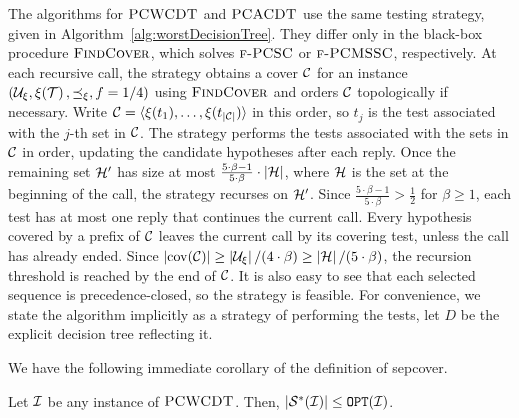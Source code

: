 
The algorithms for $\textup{\textsc{PCWCDT}}$ and $\textup{\textsc{PCACDT}}$ use the same testing strategy, given in Algorithm~\ref{alg:worstDecisionTree}. They differ only in the black-box procedure $\textup{\textsc{FindCover}}{}$, which solves $\textup{\textsc{f-PCSC}}$ or $\textup{\textsc{f-PCMSSC}}$, respectively.
At each recursive call, the strategy obtains a cover $\mathcal{C}$ for an instance $\mathopen{}\left( \mathcal{U}_{\xi},\xi\mathopen{}\left( \mathcal{T} \right),\preceq_{\xi},f=1/4 \right)$ using $\textup{\textsc{FindCover}}{}$ and orders $\mathcal{C}$ topologically if necessary. Write $\mathcal{C}=\mathopen{}\langle \xi(t_1),\ldots,\xi(t_{\mathopen{}\left| \mathcal{C} \right|}) \rangle$ in this order, so $t_j$ is the test associated with the $j$-th set in $\mathcal{C}$.
The strategy performs the tests associated with the sets in $\mathcal{C}$ in order, updating the candidate hypotheses after each reply. Once the remaining set $\mathcal{H}'$ has size at most $\frac{5\cdot\beta-1}{5\cdot\beta}\cdot\mathopen{}\left| \mathcal{H} \right|$, where $\mathcal{H}$ is the set at the beginning of the call, the strategy recurses on $\mathcal{H}'$. Since $\frac{5\cdot\beta-1}{5\cdot\beta}>\frac12$ for $\beta\geq1$, each test has at most one reply that continues the current call.
Every hypothesis covered by a prefix of $\mathcal{C}$ leaves the current call by its covering test, unless the call has already ended. Since $\mathopen{}\left| \operatorname{cov}\mathopen{}\left( \mathcal{C} \right) \right|\geq\mathopen{}\left| \mathcal{U}_{\xi} \right|/(4\cdot\beta)\geq\mathopen{}\left| \mathcal{H} \right|/(5\cdot\beta)$, the recursion threshold is reached by the end of $\mathcal{C}$. It is also easy to see that each selected sequence is precedence-closed, so the strategy is feasible.
For convenience, we state the algorithm implicitly as a strategy of performing the tests, let $D$ be the explicit decision tree reflecting it. 




We have the following immediate corollary of the definition of sepcover.
\begin{observation} \label{obs:sepcoverWC}
    Let $\mathcal{I}$ be any instance of $\textup{\textsc{PCWCDT}}$.
    Then, $\mathopen{}\left| \mathcal{S}^*\mathopen{}\left( \mathcal{I} \right) \right| \leq \texttt{OPT}\mathopen{}\left( \mathcal{I} \right)$.
\end{observation}

